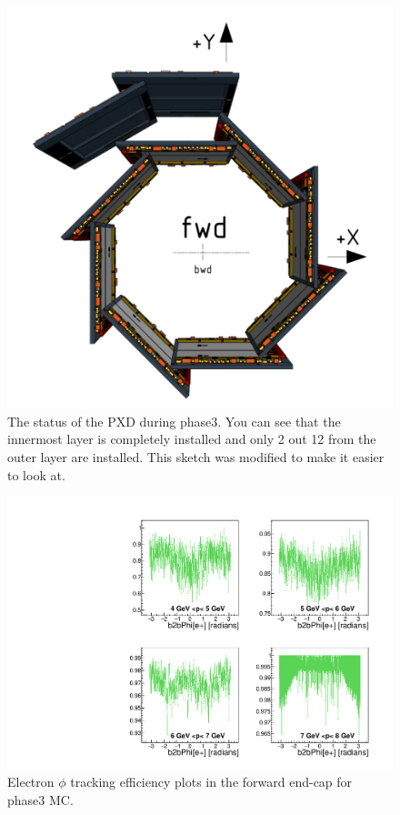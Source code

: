 \documentclass[a4paper,11pt,twosided,final,german,openbib,pdftex,listof=totoc,bibliography=totoc]{scrbook}
\begin{document}
\begin{appendix}
\begin{figure}[h!]
	\centering
	\includegraphics[width=\textwidth]{Bilder/phase3pxd.pdf}
	\caption[The Status Of The PXD In Phase3]{The status of the PXD during phase3. You can see that the innermost layer is completely installed and only 2 out 12 from the outer layer are installed. This sketch was modified to make it easier to look at.\cite{phase3pxd}}
	\label{fig:phase3pxd}
\end{figure}


\begin{figure}[!htbp]
	\centering
	\includegraphics[width=\textwidth]{Plots/master3/xPMPhiemFC_MCP3}
	\caption[Momentum $\phi$ Electron Forward End-Cap Efficiency Phase3 MC]{Electron $\phi$ tracking efficiency plots in the forward end-cap for phase3 MC.}
	\label{plt:PMPhiemFC3_MC}
\end{figure}



\end{appendix}
\end{document}
